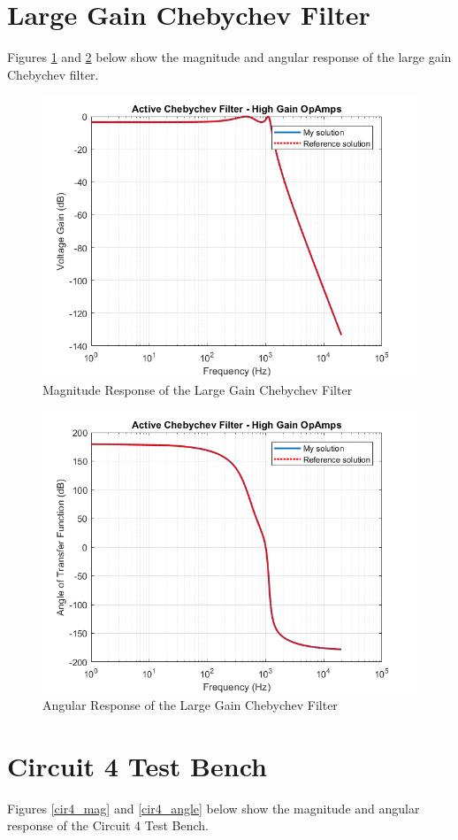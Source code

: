 \documentclass[a4paper,titlepage]{article}
\begin{document}
	\newpage
	\section{Large Gain Chebychev Filter}
	
		Figures \ref{chebychev_large_mag} and \ref{chebychev_large_angle} below show the magnitude and angular response of the large gain Chebychev filter. 
		
		\begin{figure}[H]
			\centering
			\includegraphics[width=0.7\linewidth]{../../src/a3/plots/chebychev_large_gain}
			\caption{Magnitude Response of the Large Gain Chebychev Filter}
			\label{chebychev_large_mag}
		\end{figure}
		\begin{figure}[H]
			\centering
			\includegraphics[width=0.7\linewidth]{../../src/a3/plots/chebychev_large_angle}
			\caption{Angular Response of the Large Gain Chebychev Filter}
			\label{chebychev_large_angle}
		\end{figure}
	
	\newpage
	\section{Circuit 4 Test Bench}
		Figures \ref{cir4_mag} and \ref{cir4_angle} below show the magnitude and angular response of the Circuit 4 Test Bench. 
		
\end{document}
